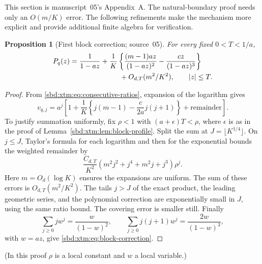 \documentclass[11pt,a4paper]{article}
\newtheorem{proposition}[theorem]{Proposition}
\theoremstyle{definition}
\begin{document}
This section is manuscript~05's Appendix~A. The natural-boundary proof
needs only an $O(m/K)$ error. The following refinements make the mechanism
more explicit and provide additional finite algebra for verification.

\begin{proposition}[First block correction; source~05]\label{sbd:xtm:prop:block-correction}
For every fixed $0<T<1/a$,
\begin{equation}\label{sbd:xtm:eq:block-correction}
\begin{split}
 P_q(z)={}&\frac1{1-az}
 +\frac1K\left\{
   \frac{(m-1)az}{(1-az)^2}
       -\frac{cz}{(1-az)^3}\right\}\\
 &\hspace{20mm}+O_{d,T}(m^2/K^2),\qquad |z|\le T.
\end{split}
\end{equation}
\end{proposition}
\begin{proof}
From \eqref{sbd:xtm:eq:consecutive-ratios}, expansion of the logarithm gives
\[
 v_{q,j}=a^j\left[1+\frac1K
    \left\{j(m-1)-\frac c{2a}j(j+1)\right\}
    +\text{remainder}\right].
\]
To justify summation uniformly, fix $\rho<1$ with $(a+\epsilon)T<\rho$,
where $\epsilon$ is as in the proof of
Lemma~\ref{sbd:xtm:lem:block-profile}. Split the sum at
$J=\lfloor K^{1/4}\rfloor$. On $j\le J$, Taylor's formula for each logarithm
and then for the exponential bounds the weighted remainder by
\[
 \frac{C_{d,T}}{K^2}
   (m^2j^2+j^4+m^2j+j^3)\rho^j.
\]
Here $m=O_d(\log K)$ ensures the expansions are uniform. The sum of these
errors is $O_{d,T}(m^2/K^2)$. The tails $j>J$ of the exact product, the
leading geometric series, and the polynomial correction are exponentially
small in $J$, using the same ratio bound. The covering error is smaller
still. Finally
\[
 \sum_{j\ge0}jw^j=\frac w{(1-w)^2},\qquad
 \sum_{j\ge0}j(j+1)w^j=\frac{2w}{(1-w)^3},
\]
with $w=az$, give \eqref{sbd:xtm:eq:block-correction}.
\end{proof}
(In this proof $\rho$ is a local constant and $w$ a local variable.)
\end{document}

